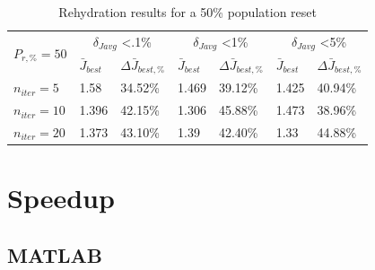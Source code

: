 \begin{table}[H]
    \centering
    \begin{tabular}{lll|ll|ll}
      \toprule
      \multirow{2}{*}{$P_{r,\text{\%}} = 50$} &
        \multicolumn{2}{c}{$\delta_{Javg}$ \textless .1\%} &
        \multicolumn{2}{c}{$\delta_{Javg}$ \textless 1\%} &
        \multicolumn{2}{c}{$\delta_{Javg}$ \textless 5\%} \\
        \cmidrule{2-7}
      & $\bar{J}_{best}$ & $\Delta \bar{J}_{best,\text{\%}}$ & $\bar{J}_{best}$ & $\Delta \bar{J}_{best,\text{\%}}$ & $\bar{J}_{best}$ & $\Delta \bar{J}_{best,\text{\%}}$ \\
      \midrule

      $n_{iter}=5$ & 1.58 & 34.52\% & 1.469 & 39.12\% & 1.425 & 40.94\% \\
      $n_{iter}=10$ & 1.396 & 42.15\% & 1.306 & 45.88\% & 1.473 & 38.96\% \\
      $n_{iter}=20$ & 1.373 & 43.10\% & 1.39 & 42.40\% & 1.33 & 44.88\% \\
      \bottomrule
    \end{tabular}
    \caption{Rehydration results for a 50\% population reset}
    \label{tab:rehydation-p50}
  \end{table}

\section{Speedup}

\subsection{MATLAB}

